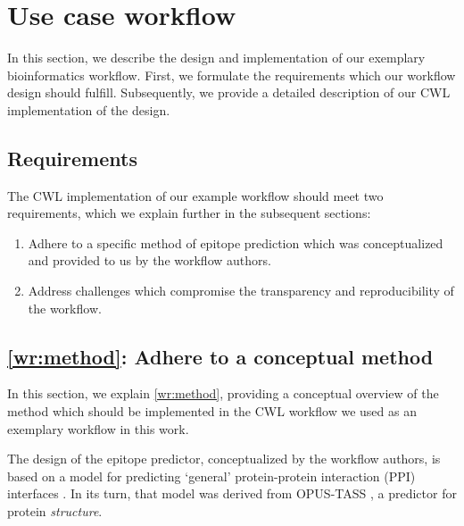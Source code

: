 \section{Use case workflow}
\label{sup:workflow}

In this section, we describe the design and implementation of our exemplary bioinformatics workflow. First, we formulate the requirements which our workflow design should fulfill. Subsequently, we provide a detailed description of our CWL implementation of the design.

\subsection{Requirements}
\label{sec:wf_requirements}


The CWL implementation of our example workflow should meet two requirements, which we explain further in the subsequent sections:

\begin{enumerate}[label=\textbf{WR\arabic*}]
    \item \label{wr:method} Adhere to a specific method of epitope prediction which was conceptualized and provided to us by the workflow authors.
    \item \label{wr:reproducibility} Address challenges which compromise the transparency and reproducibility of the workflow.
\end{enumerate}


\subsection{\ref{wr:method}: Adhere to a conceptual method}
\label{sec:wf_design}

In this section, we explain \ref{wr:method}, providing a conceptual overview of the method which should be implemented in the CWL workflow we used as an exemplary workflow in this work.

The design of the epitope predictor, conceptualized by the workflow authors, is based on a model for predicting `general' protein-protein interaction (PPI) interfaces \cite{capelMultitaskLearningLeverage2022}. In its turn, that model was derived from OPUS-TASS \cite{xuOPUSTASSProteinBackbone2020}, a predictor for protein \emph{structure}. 

